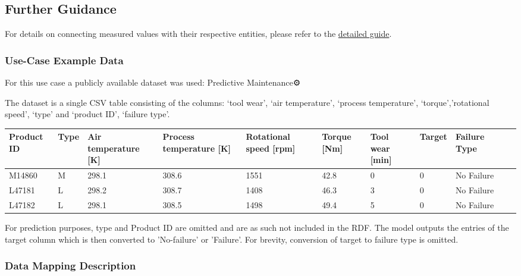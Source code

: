 \subsection*{Further Guidance}  
For details on connecting measured values with their respective entities, please refer to the \href{placeholder link}{detailed guide}.  

\subsubsection*{Use-Case Example Data}

For this use case a publicly available dataset was used: Predictive Maintenance⚙️ 

The dataset is a single CSV table consisting of the columns: ‘tool wear’, ‘air temperature’, ‘process temperature’, ‘torque’,’rotational speed’, ‘type’ and ‘product ID’, ‘failure type’.

\begin{tabularx}{\textwidth}{|l|X|X|X|X|X|X|X|X|X|X|}
\hline
Product ID & Type & Air temperature {[}K{]} & Process temperature {[}K{]} & Rotational speed {[}rpm{]} & Torque {[}Nm{]} & Tool wear {[}min{]} & Target & Failure Type \\ \hline
M14860     & M    & 298.1                   & 308.6                       & 1551                       & 42.8            & 0                   & 0      & No Failure   \\
L47181     & L    & 298.2                   & 308.7                       & 1408                       & 46.3            & 3                   & 0      & No Failure   \\
L47182     & L    & 298.1                   & 308.5                       & 1498                       & 49.4            & 5                   & 0      & No Failure   \\ \hline
\end{tabularx}

For prediction purposes, type and Product ID are omitted and are as such not included in the RDF. The model outputs the entries of the  target column which is then converted to 'No-failure' or 'Failure'. For brevity, conversion of target to failure type is omitted.
\subsubsection*{Data Mapping Description}

